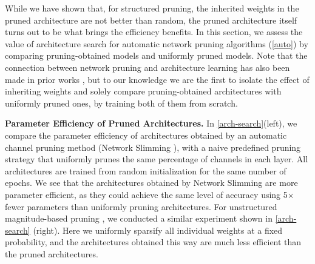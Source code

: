 
While we have shown that, for structured pruning, the inherited weights in the pruned architecture are not better than random, the pruned architecture itself turns out to be what brings the efficiency benefits. 
In this section, we assess the value of architecture search for automatic network pruning algorithms (\autoref{auto}) by comparing pruning-obtained models and uniformly pruned models. Note that the connection between network pruning and architecture learning has also been made in prior works \citep{han2015learning,liu2017learning,gordon2018morphnet,huang2018condensenet}, but to our knowledge we are the first to isolate the effect of inheriting weights and solely compare pruning-obtained architectures with uniformly pruned ones, by training both of them from scratch.


\vspace{1.5ex}
\textbf{Parameter Efficiency of Pruned Architectures.} In \autoref{arch-search}(left), we compare the parameter efficiency of architectures obtained by an automatic channel pruning method (Network Slimming \citep{liu2017learning}),  with a naive predefined pruning strategy that uniformly prunes the same percentage of channels in each layer. All architectures are trained from random initialization for the same number of epochs. We see that the architectures obtained by Network Slimming are more parameter efficient, as they could achieve the same level of accuracy using 5$\times$ fewer parameters than uniformly pruning architectures. 
For unstructured magnitude-based pruning \citep{han2015learning}, we conducted a similar experiment shown in \autoref{arch-search} (right). Here we uniformly sparsify all individual weights at a fixed probability, and the architectures obtained this way are much less efficient than the pruned architectures. 

